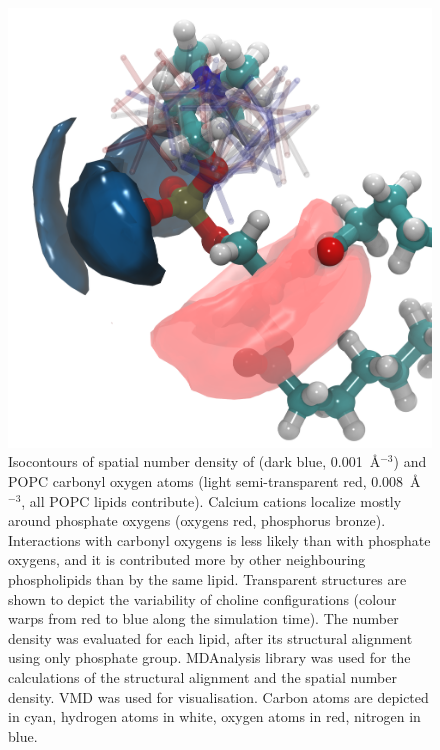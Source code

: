 \begin{figure}[tb!] 
  \centering 
  \includegraphics[width=\figwidth]{../img/ecc_popc/isocontours_r37_ca_O-carb.png} 
  \caption{\label{fig:volmaps} 
    Isocontours of spatial number density of  (dark blue, 0.001~Å$^{-3}$) 
    and POPC carbonyl oxygen atoms (light semi-transparent red, 0.008~Å$^{-3}$, all POPC lipids contribute). 
    Calcium cations localize mostly around phosphate oxygens (oxygens red, phosphorus bronze).
    Interactions with carbonyl oxygens is less likely than with phosphate oxygens, 
    and it is contributed more by other neighbouring phospholipids than by the same lipid. 
    Transparent structures are shown to depict the variability of choline configurations 
    (colour warps from red to blue along the simulation time). 
    The number density was evaluated for each lipid, 
    after its structural alignment using only phosphate group.
    MDAnalysis \citep{mdanalysis2011} library was used for 
    the calculations of the structural alignment and the spatial number density. 
    VMD \citep{hump96} was used for visualisation. 
    Carbon atoms are depicted in cyan, hydrogen atoms in white, oxygen atoms in red, nitrogen in blue.
  } 
\end{figure} 
 
